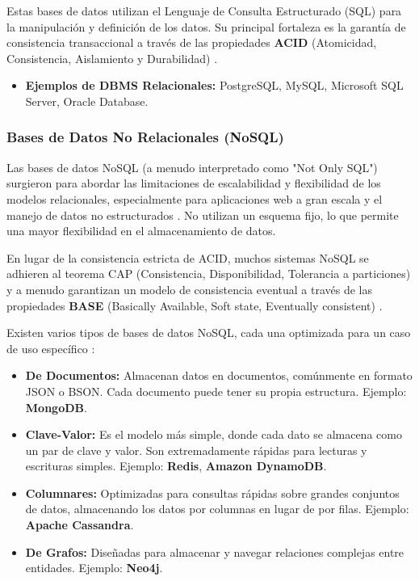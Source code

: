 Estas bases de datos utilizan el Lenguaje de Consulta Estructurado (SQL) para la manipulación y definición de los datos. Su principal fortaleza es la garantía de consistencia transaccional a través de las propiedades \textbf{ACID} (Atomicidad, Consistencia, Aislamiento y Durabilidad) \cite{oracle2024acid}.
\begin{itemize}
    \item \textbf{Ejemplos de DBMS Relacionales:} PostgreSQL, MySQL, Microsoft SQL Server, Oracle Database.
\end{itemize}

\subsubsection{Bases de Datos No Relacionales (NoSQL)}
Las bases de datos NoSQL (a menudo interpretado como "Not Only SQL") surgieron para abordar las limitaciones de escalabilidad y flexibilidad de los modelos relacionales, especialmente para aplicaciones web a gran escala y el manejo de datos no estructurados \cite{aws2024nosql}. No utilizan un esquema fijo, lo que permite una mayor flexibilidad en el almacenamiento de datos.

En lugar de la consistencia estricta de ACID, muchos sistemas NoSQL se adhieren al teorema CAP (Consistencia, Disponibilidad, Tolerancia a particiones) y a menudo garantizan un modelo de consistencia eventual a través de las propiedades \textbf{BASE} (Basically Available, Soft state, Eventually consistent) \cite{mongodb2024sqlvsnosql}.

Existen varios tipos de bases de datos NoSQL, cada una optimizada para un caso de uso específico \cite{aws2024nosql}:
\begin{itemize}
    \item \textbf{De Documentos:} Almacenan datos en documentos, comúnmente en formato JSON o BSON. Cada documento puede tener su propia estructura. Ejemplo: \textbf{MongoDB}.
    \item \textbf{Clave-Valor:} Es el modelo más simple, donde cada dato se almacena como un par de clave y valor. Son extremadamente rápidas para lecturas y escrituras simples. Ejemplo: \textbf{Redis}, \textbf{Amazon DynamoDB}.
    \item \textbf{Columnares:} Optimizadas para consultas rápidas sobre grandes conjuntos de datos, almacenando los datos por columnas en lugar de por filas. Ejemplo: \textbf{Apache Cassandra}.
    \item \textbf{De Grafos:} Diseñadas para almacenar y navegar relaciones complejas entre entidades. Ejemplo: \textbf{Neo4j}.
\end{itemize}

